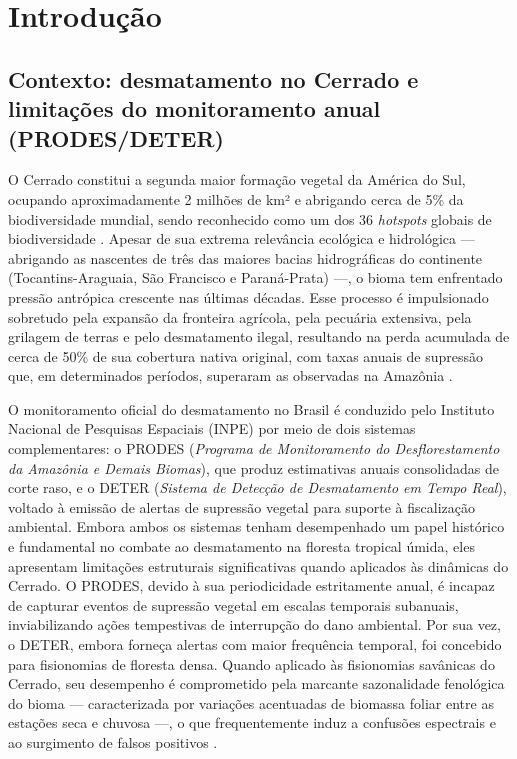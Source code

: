 \documentclass[12pt,a4paper]{article}
\begin{document}
\section{Introdução}
\label{sec:introducao}

\subsection{Contexto: desmatamento no Cerrado e limitações do monitoramento anual (PRODES/DETER)}
\label{subsec:contexto}

O Cerrado constitui a segunda maior formação vegetal da América do Sul, ocupando aproximadamente 2 milhões de km² e abrigando cerca de 5\% da biodiversidade mundial, sendo reconhecido como um dos 36 \textit{hotspots} globais de biodiversidade \citep{myers2000biodiversity}. Apesar de sua extrema relevância ecológica e hidrológica — abrigando as nascentes de três das maiores bacias hidrográficas do continente (Tocantins-Araguaia, São Francisco e Paraná-Prata) —, o bioma tem enfrentado pressão antrópica crescente nas últimas décadas. Esse processo é impulsionado sobretudo pela expansão da fronteira agrícola, pela pecuária extensiva, pela grilagem de terras e pelo desmatamento ilegal, resultando na perda acumulada de cerca de 50\% de sua cobertura nativa original, com taxas anuais de supressão que, em determinados períodos, superaram as observadas na Amazônia \citep{mapbiomas2023}.

O monitoramento oficial do desmatamento no Brasil é conduzido pelo Instituto Nacional de Pesquisas Espaciais (INPE) por meio de dois sistemas complementares: o PRODES (\textit{Programa de Monitoramento do Desflorestamento da Amazônia e Demais Biomas}), que produz estimativas anuais consolidadas de corte raso, e o DETER (\textit{Sistema de Detecção de Desmatamento em Tempo Real}), voltado à emissão de alertas de supressão vegetal para suporte à fiscalização ambiental. Embora ambos os sistemas tenham desempenhado um papel histórico e fundamental no combate ao desmatamento na floresta tropical úmida, eles apresentam limitações estruturais significativas quando aplicados às dinâmicas do Cerrado. O PRODES, devido à sua periodicidade estritamente anual, é incapaz de capturar eventos de supressão vegetal em escalas temporais subanuais, inviabilizando ações tempestivas de interrupção do dano ambiental. Por sua vez, o DETER, embora forneça alertas com maior frequência temporal, foi concebido para fisionomias de floresta densa. Quando aplicado às fisionomias savânicas do Cerrado, seu desempenho é comprometido pela marcante sazonalidade fenológica do bioma — caracterizada por variações acentuadas de biomassa foliar entre as estações seca e chuvosa —, o que frequentemente induz a confusões espectrais e ao surgimento de falsos positivos \citep{shimabukuro2012deter}.
\end{document}
